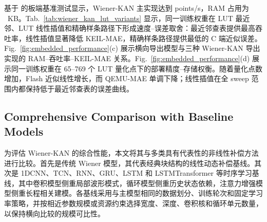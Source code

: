 \documentclass[sn-nature]{sn-jnl}
\begin{document}
基于 \valTargetMcu{} 的板端基准测试显示，Wiener-KAN 主实现达到 \valPrimaryKeilFps{} points/s，RAM 占用为 \valPrimaryKeilRamKB~KB。Tab.~\ref{tab:wiener_kan_lut_variants} 显示，同一训练权重在 LUT 最近邻、LUT 线性插值和精确样条路径下形成速度--误差取舍：最近邻查表提供最高吞吐率，线性插值显著降低 KEIL-MAE，精确样条路径提供最低的 C 端近似误差。Fig.~\ref{fig:embedded_performance}(c) 展示横向导出模型与三种 Wiener-KAN 导出实现的 RAM--吞吐率--KEIL-MAE 关系。Fig.~\ref{fig:embedded_performance}(d) 展示同一训练权重在 65--769 个 LUT 量化点下的部署精度--存储权衡。随着量化点数增加，Flash 近似线性增长，而 QEMU-MAE 单调下降；线性插值在全 sweep 范围内都保持低于最近邻查表的误差曲线。

\subsection{Comprehensive Comparison with Baseline Models}

为评估 Wiener-KAN 的综合性能，本文将其与多类具有代表性的非线性补偿方法进行比较。首先是传统 Wiener 模型，其代表经典块结构的线性动态补偿基线。其次是 1DCNN、TCN、RNN、GRU、LSTM 和 LSTMTransformer 等时序学习基线，其中卷积模型侧重局部波形模式，循环模型侧重历史状态依赖，注意力增强模型侧重长程相关建模。各基线采用与主模型相同的数据划分、训练轮次和固定学习率策略，并按相近参数规模或资源约束选择宽度、深度、卷积核和循环单元数量，以保持横向比较的规模可比性。
\end{document}
